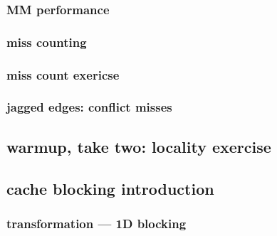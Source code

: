 \subsubsection{MM performance}


\subsubsection{miss counting}


\subsubsection{miss count exericse}


\subsubsection{jagged edges: conflict misses} %



\subsection{warmup, take two: locality exercise}


\subsection{cache blocking introduction}
%
\subsubsection{transformation --- 1D blocking}






